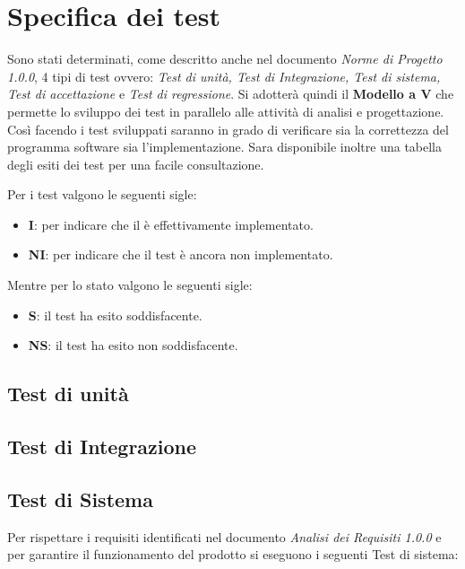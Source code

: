 \section{Specifica dei test}

Sono stati determinati, come descritto anche nel documento \textit{Norme di Progetto 1.0.0}, 4 tipi di test ovvero: \textit{Test di unità, Test di Integrazione, Test di sistema, Test di accettazione} e \textit{Test di regressione}. Si adotterà quindi il \textbf{Modello a V} che permette lo sviluppo dei test in parallelo alle attività di analisi e progettazione. Così facendo i test sviluppati saranno in grado di verificare sia la correttezza del programma software sia l'implementazione. Sara disponibile inoltre una tabella degli esiti dei test per una facile consultazione.

Per i test valgono le seguenti sigle:

    \begin{itemize}
        \item \textbf{I}: per indicare che il è effettivamente implementato.
        \item \textbf{NI}: per indicare che il test è ancora non implementato.
    \end{itemize}
    
Mentre per lo stato valgono le seguenti sigle:

    \begin{itemize}
        \item \textbf{S}: il test ha esito soddisfacente.
        \item \textbf{NS}: il test ha esito non soddisfacente.
    \end{itemize}
    
    
    \subsection{Test di unità}
    \subsection{Test di Integrazione}
 
    \subsection{Test di Sistema}
    
    Per rispettare i requisiti identificati nel documento \textit{Analisi dei Requisiti 1.0.0} e per garantire il funzionamento del prodotto si eseguono i seguenti Test di sistema:\\
    
